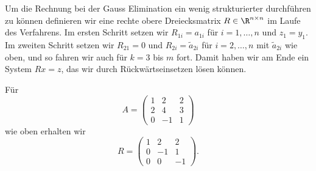 Um die Rechnung bei der Gauss Elimination ein wenig strukturierter durchführen zu können definieren wir eine rechte obere Dreiecksmatrix \(R \in \R^{n \times n}\) im Laufe des Verfahrens. Im ersten Schritt setzen wir \(R_{1i}=a_{1i}\) für \(i=1,\ldots,n\) und \(z_1=y_1\). Im zweiten Schritt setzen wir \(R_{21} =0\) und \(R_{2i} = \tilde a_{2i}\) für \(i=2, \ldots,n\) mit \(\tilde a_{2i}\) wie oben, und so fahren wir auch für \(k=3\) bis \(m\) fort. Damit haben wir am Ende ein System \(Rx=z\), das wir durch Rückwärtseinsetzen lösen können.
\label{vektorraeume/LGS:example-21}
\begin{example}{}{}



Für
\begin{equation*}
 A = \left( \begin{matrix} 1 & 2 & 2 \\ 2 & 4 & 3 \\ 0 & -1 & 1 \end{matrix} \right)
\end{equation*}
wie oben erhalten wir
\begin{equation*}
 R = \left( \begin{matrix} 1 & 2 & 2 \\ 0 & -1 & 1 \\ 0 & 0 & -1 \end{matrix} \right).
\end{equation*}\end{example}

